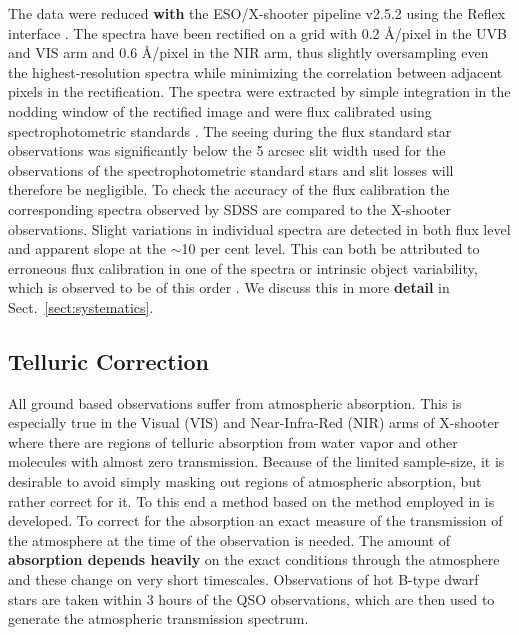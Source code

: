 \documentclass{aa}    %
\newcommand{\sectionname}{Sect.}
\newcommand{\Sect}[1]{\sectionname~\ref{sect:#1}}
\newcommand{\sect}[1]{\Sect{#1}}
\newcommand{\sectlabel}[1]{\label{sect:#1}}
\begin{document}
The data were reduced \textbf{with} the ESO/X-shooter pipeline v2.5.2
\citep{Modigliani2010} using the Reflex interface \citep{Freudling2013}. The
spectra have been rectified on a grid with 0.2 \AA/pixel in the UVB and VIS arm
and 0.6 \AA/pixel in the NIR arm, thus slightly oversampling even the
highest-resolution spectra while minimizing the correlation between adjacent
pixels in the rectification. The spectra were extracted by simple integration in
the nodding window of the rectified image and were flux calibrated using
spectrophotometric standards \citep{Vernet2010, Hamuy1994}. The seeing during the
flux standard star observations was significantly below the 5 arcsec slit width
used for the observations of the spectrophotometric standard stars and slit
losses will therefore be negligible. To check the accuracy of the flux
calibration the corresponding spectra observed by SDSS \citep{Ahn2014} are
compared to the X-shooter observations. Slight variations in individual spectra
are detected in both flux level and apparent slope at the $\sim$10 per cent
level. This can both be attributed to erroneous flux calibration in one of the
spectra or intrinsic object variability, which is observed to be of this order
\citep{MacLeod2012, Morganson2014}. We discuss this in more \textbf{detail} in
\sect{systematics}.





\subsection{Telluric Correction}   \sectlabel{telluric}

All ground based observations suffer from atmospheric absorption. This
is especially true in the Visual (VIS) and Near-Infra-Red (NIR) arms
of X-shooter where there are regions of telluric absorption from water
vapor and other molecules with almost zero transmission. Because of
the limited sample-size, it is desirable to avoid simply masking out
regions of atmospheric absorption, but rather correct for it. To this
end a method based on the method employed in \citet{Chen2014} is
developed.  To correct for the absorption an exact measure of the
transmission of the atmosphere at the time of the observation is
needed. The amount of \textbf{absorption depends heavily} on the exact
conditions through the atmosphere and these change on very short
timescales. Observations of hot B-type dwarf stars are taken within 3
hours of the QSO observations, which are then used to
generate the atmospheric transmission spectrum.
\end{document}
